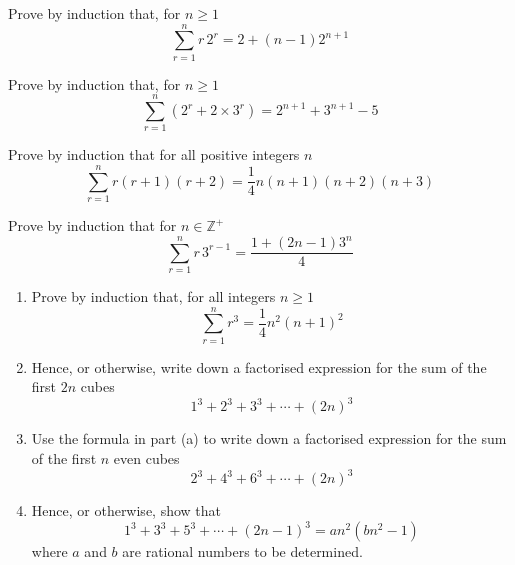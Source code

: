 \documentclass[leqno]{article}
\begin{document}
\djsFrontMatter
\begin{enumerate}[
  label=\textbf{\arabic*.},
  leftmargin=*,
  topsep=0pt,
  partopsep=0pt,
  parsep=0pt
]


\questionitem

Prove by induction that, for $n \geq 1$
\[
\sum_{r=1}^{n} r\,2^r = 2 + (n-1)2^{n+1}
\]

\newpage

\questionitem

Prove by induction that, for $n \geq 1$
\[
\sum_{r=1}^{n} \left(2^r + 2 \times 3^r\right) = 2^{n+1} + 3^{n+1} - 5
\]


\newpage


\questionitem

Prove by induction that for all positive integers $n$
\[
\sum_{r=1}^{n} r(r+1)(r+2)=\frac{1}{4}n(n+1)(n+2)(n+3)
\]
\newpage
\questionitem

Prove by induction that for $n \in \mathbb{Z}^{+}$
\[
\sum_{r=1}^{n} r\,3^{r-1} = \frac{1 + (2n - 1)3^n}{4}
\]

\newpage

\questionitem

\begin{enumerate}[label=\textbf{(\alph*)}]
  \item Prove by induction that, for all integers $n \ge 1$
  \[
  \sum_{r=1}^{n} r^3 = \frac{1}{4}n^2(n+1)^2
  \]
  \item Hence, or otherwise, write down a factorised expression for the sum of the first $2n$ cubes
  \[
  1^3 + 2^3 + 3^3 + \cdots + (2n)^3
  \]
  \item Use the formula in part (a) to write down a factorised expression for the sum of the first $n$ even cubes
  \[
  2^3 + 4^3 + 6^3 + \cdots + (2n)^3
  \]
  \item Hence, or otherwise, show that
  \[
  1^3 + 3^3 + 5^3 + \cdots + (2n-1)^3 = an^2(bn^2-1)
  \]
  where $a$ and $b$ are rational numbers to be determined.  \\
\end{enumerate}


\end{enumerate}
\end{document}
